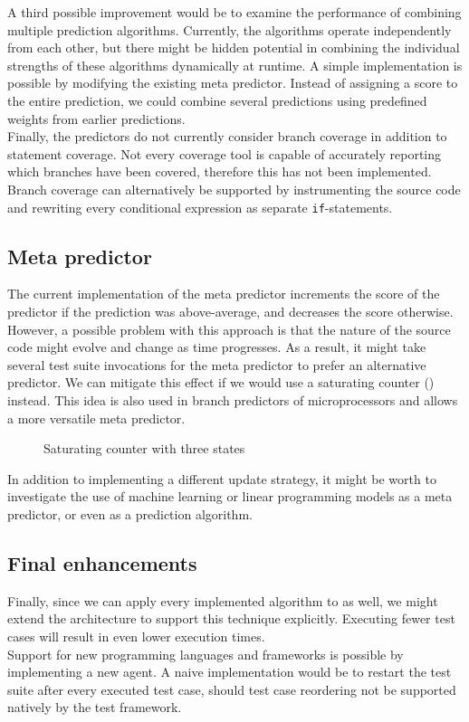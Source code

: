 \noindent A third possible improvement would be to examine the performance of combining multiple prediction algorithms. Currently, the algorithms operate independently from each other, but there might be hidden potential in combining the individual strengths of these algorithms dynamically at runtime. A simple implementation is possible by modifying the existing meta predictor. Instead of assigning a score to the entire prediction, we could combine several predictions using predefined weights from earlier predictions.\\

\noindent Finally, the predictors do not currently consider branch coverage in addition to statement coverage. Not every coverage tool is capable of accurately reporting which branches have been covered, therefore this has not been implemented. Branch coverage can alternatively be supported by instrumenting the source code and rewriting every conditional expression as separate \texttt{if}-statements.

\subsection{Meta predictor}
The current implementation of the meta predictor increments the score of the predictor if the prediction was above-average, and decreases the score otherwise. However, a possible problem with this approach is that the nature of the source code might evolve and change as time progresses. As a result, it might take several test suite invocations for the meta predictor to prefer an alternative predictor. We can mitigate this effect if we would use a saturating counter () instead. This idea is also used in branch predictors of microprocessors and allows a more versatile meta predictor.

\begin{figure}[htbp!]
	\centering
	
	\caption{Saturating counter with three states}
	\label{fig:saturating-counter}
\end{figure}

\noindent In addition to implementing a different update strategy, it might be worth to investigate the use of machine learning or linear programming models as a meta predictor, or even as a prediction algorithm.

\subsection{Final enhancements}
Finally, since we can apply every implemented algorithm to \tsm{} as well, we might extend the architecture to support this technique explicitly. Executing fewer test cases will result in even lower execution times.\\

\noindent Support for new programming languages and frameworks is possible by implementing a new agent. A naive implementation would be to restart the test suite after every executed test case, should test case reordering not be supported natively by the test framework.